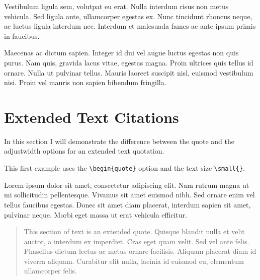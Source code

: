 Vestibulum ligula sem, volutpat eu erat. Nulla interdum risus non metus vehicula. Sed ligula ante, ullamcorper egestas ex. Nunc tincidunt rhoncus neque, ac luctus ligula interdum nec. Interdum et malesuada fames ac ante ipsum primis in faucibus.\parencite[see][p.10]{mcguigan2014neoliberal}

 Maecenas ac dictum sapien. Integer id dui vel augue luctus egestas non quis purus. Nam quis, gravida lacus vitae, egestas magna. Proin ultrices quis tellus id ornare. Nulla ut pulvinar tellus. Mauris laoreet suscipit nisl, euismod vestibulum nisi. Proin vel mauris non sapien bibendum fringilla. \parencite[see][]{Han2015WhyRevolution}



\newpage

\section{Extended Text Citations}

In this section I will demonstrate the difference between the quote and the adjustwidth options for an extended text quotation. 

\vspace{0.4cm}

This first example uses the \verb|\begin{quote}| option and the text size \verb|\small{}|. 

\vspace{0.4cm}

Lorem ipsum dolor sit amet, consectetur adipiscing elit. Nam rutrum magna ut mi sollicitudin pellentesque. Vivamus sit amet euismod nibh. Sed ornare enim vel tellus faucibus egestas. Donec sit amet diam placerat, interdum sapien sit amet, pulvinar neque. Morbi eget massa ut erat vehicula efficitur. 

\begin{quote}

\small{This section of text is an extended quote. Quisque blandit nulla et velit auctor, a interdum ex imperdiet. Cras eget quam velit. Sed vel ante felis. Phasellus dictum lectus ac metus ornare facilisis. Aliquam placerat diam id viverra aliquam. Curabitur elit nulla, lacinia id euismod eu, elementum ullamcorper felis.} \parencite[][p. 100]{sennett1998corrosion}

\end{quote}

